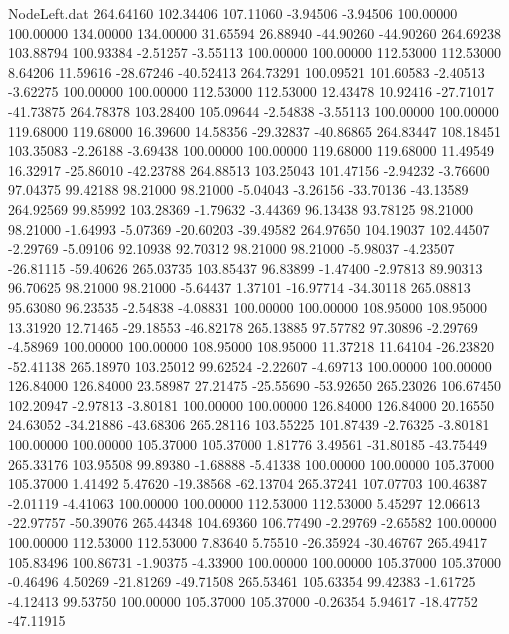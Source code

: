\begin{filecontents}{NodeLeft.dat}
 264.64160  102.34406  107.11060    -3.94506   -3.94506  100.00000  100.00000  134.00000  134.00000   31.65594   26.88940  -44.90260  -44.90260
 264.69238  103.88794  100.93384    -2.51257   -3.55113  100.00000  100.00000  112.53000  112.53000    8.64206   11.59616  -28.67246  -40.52413
 264.73291  100.09521  101.60583    -2.40513   -3.62275  100.00000  100.00000  112.53000  112.53000   12.43478   10.92416  -27.71017  -41.73875
 264.78378  103.28400  105.09644    -2.54838   -3.55113  100.00000  100.00000  119.68000  119.68000   16.39600   14.58356  -29.32837  -40.86865
 264.83447  108.18451  103.35083    -2.26188   -3.69438  100.00000  100.00000  119.68000  119.68000   11.49549   16.32917  -25.86010  -42.23788
 264.88513  103.25043  101.47156    -2.94232   -3.76600   97.04375   99.42188   98.21000   98.21000   -5.04043   -3.26156  -33.70136  -43.13589
 264.92569   99.85992  103.28369    -1.79632   -3.44369   96.13438   93.78125   98.21000   98.21000   -1.64993   -5.07369  -20.60203  -39.49582
 264.97650  104.19037  102.44507    -2.29769   -5.09106   92.10938   92.70312   98.21000   98.21000   -5.98037   -4.23507  -26.81115  -59.40626
 265.03735  103.85437   96.83899    -1.47400   -2.97813   89.90313   96.70625   98.21000   98.21000   -5.64437    1.37101  -16.97714  -34.30118
 265.08813   95.63080   96.23535    -2.54838   -4.08831  100.00000  100.00000  108.95000  108.95000   13.31920   12.71465  -29.18553  -46.82178
 265.13885   97.57782   97.30896    -2.29769   -4.58969  100.00000  100.00000  108.95000  108.95000   11.37218   11.64104  -26.23820  -52.41138
 265.18970  103.25012   99.62524    -2.22607   -4.69713  100.00000  100.00000  126.84000  126.84000   23.58987   27.21475  -25.55690  -53.92650
 265.23026  106.67450  102.20947    -2.97813   -3.80181  100.00000  100.00000  126.84000  126.84000   20.16550   24.63052  -34.21886  -43.68306
 265.28116  103.55225  101.87439    -2.76325   -3.80181  100.00000  100.00000  105.37000  105.37000    1.81776    3.49561  -31.80185  -43.75449
 265.33176  103.95508   99.89380    -1.68888   -5.41338  100.00000  100.00000  105.37000  105.37000    1.41492    5.47620  -19.38568  -62.13704
 265.37241  107.07703  100.46387    -2.01119   -4.41063  100.00000  100.00000  112.53000  112.53000    5.45297   12.06613  -22.97757  -50.39076
 265.44348  104.69360  106.77490    -2.29769   -2.65582  100.00000  100.00000  112.53000  112.53000    7.83640    5.75510  -26.35924  -30.46767
 265.49417  105.83496  100.86731    -1.90375   -4.33900  100.00000  100.00000  105.37000  105.37000   -0.46496    4.50269  -21.81269  -49.71508
 265.53461  105.63354   99.42383    -1.61725   -4.12413   99.53750  100.00000  105.37000  105.37000   -0.26354    5.94617  -18.47752  -47.11915

\end{filecontents}
